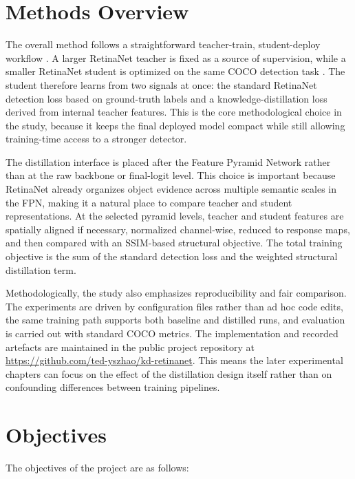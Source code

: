 \section{Methods Overview}

The overall method follows a straightforward teacher-train, student-deploy workflow \cite{hinton2015distilling}. A larger RetinaNet teacher is fixed as a source of supervision, while a smaller RetinaNet student is optimized on the same COCO detection task \cite{lin2014coco}. The student therefore learns from two signals at once: the standard RetinaNet detection loss based on ground-truth labels and a knowledge-distillation loss derived from internal teacher features. This is the core methodological choice in the study, because it keeps the final deployed model compact while still allowing training-time access to a stronger detector.

The distillation interface is placed after the Feature Pyramid Network rather than at the raw backbone or final-logit level. This choice is important because RetinaNet already organizes object evidence across multiple semantic scales in the FPN, making it a natural place to compare teacher and student representations. At the selected pyramid levels, teacher and student features are spatially aligned if necessary, normalized channel-wise, reduced to response maps, and then compared with an SSIM-based structural objective. The total training objective is the sum of the standard detection loss and the weighted structural distillation term.

Methodologically, the study also emphasizes reproducibility and fair comparison. The experiments are driven by configuration files rather than ad hoc code edits, the same training path supports both baseline and distilled runs, and evaluation is carried out with standard COCO metrics. The implementation and recorded artefacts are maintained in the public project repository at \url{https://github.com/ted-yszhao/kd-retinanet}. This means the later experimental chapters can focus on the effect of the distillation design itself rather than on confounding differences between training pipelines.

\section{Objectives}

The objectives of the project are as follows:

